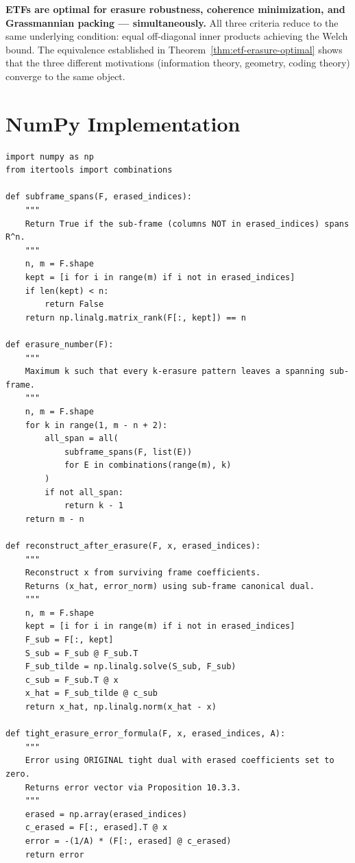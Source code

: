 \begin{keyidea}
\textbf{ETFs are optimal for erasure robustness, coherence minimization,
and Grassmannian packing --- simultaneously.} All three criteria reduce to
the same underlying condition: equal off-diagonal inner products achieving
the Welch bound. The equivalence established in Theorem~\ref{thm:etf-erasure-optimal}
shows that the three different motivations (information theory, geometry,
coding theory) converge to the same object.
\end{keyidea}

\section{NumPy Implementation}
\label{sec:numpy-erasures}

\begin{lstlisting}[caption={Erasure robustness tools in NumPy}]
import numpy as np
from itertools import combinations

def subframe_spans(F, erased_indices):
    """
    Return True if the sub-frame (columns NOT in erased_indices) spans R^n.
    """
    n, m = F.shape
    kept = [i for i in range(m) if i not in erased_indices]
    if len(kept) < n:
        return False
    return np.linalg.matrix_rank(F[:, kept]) == n

def erasure_number(F):
    """
    Maximum k such that every k-erasure pattern leaves a spanning sub-frame.
    """
    n, m = F.shape
    for k in range(1, m - n + 2):
        all_span = all(
            subframe_spans(F, list(E))
            for E in combinations(range(m), k)
        )
        if not all_span:
            return k - 1
    return m - n

def reconstruct_after_erasure(F, x, erased_indices):
    """
    Reconstruct x from surviving frame coefficients.
    Returns (x_hat, error_norm) using sub-frame canonical dual.
    """
    n, m = F.shape
    kept = [i for i in range(m) if i not in erased_indices]
    F_sub = F[:, kept]
    S_sub = F_sub @ F_sub.T
    F_sub_tilde = np.linalg.solve(S_sub, F_sub)
    c_sub = F_sub.T @ x
    x_hat = F_sub_tilde @ c_sub
    return x_hat, np.linalg.norm(x_hat - x)

def tight_erasure_error_formula(F, x, erased_indices, A):
    """
    Error using ORIGINAL tight dual with erased coefficients set to zero.
    Returns error vector via Proposition 10.3.3.
    """
    erased = np.array(erased_indices)
    c_erased = F[:, erased].T @ x
    error = -(1/A) * (F[:, erased] @ c_erased)
    return error


\end{lstlisting}
